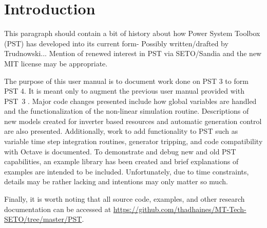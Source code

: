 \vspace{2em} %
\chapter*{Introduction}

This paragraph should contain a bit of history about how Power System Toolbox (PST) has developed into its current form- Possibly written/drafted by Trudnowski...
Mention of renewed interest in PST via SETO/Sandia and the new MIT license may be appropriate.

\vspace{1em}
The purpose of this user manual is to document work done on PST 3 to form PST 4. 
It is meant only to augment the previous user manual provided with \mbox{PST 3} \cite{PST3manual}.
%
Major code changes presented include 
how global variables are handled
and the
functionalization of the non-linear simulation routine.
%
Descriptions of new models created for
inverter based resources
and
automatic generation control
are also presented.
%
Additionally, work to add functionality to PST such as
variable time step integration routines,
generator tripping, %
and
code compatibility with Octave
is documented.
%
To demonstrate and debug new and old PST capabilities, an example library has been created and brief explanations of examples are intended to be included.
Unfortunately, due to time constraints, details may be rather lacking and intentions may only matter so much.

\vspace{1em}
Finally, it is worth noting that all source code, examples, and other research documentation can be accessed at 
\href{https://github.com/thadhaines/MT-Tech-SETO/tree/master/PST}{https://github.com/thadhaines/MT-Tech-SETO/tree/master/PST}.